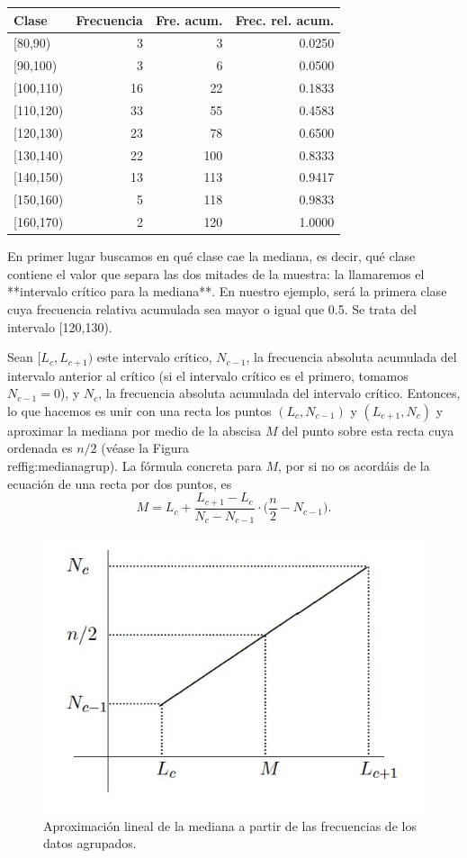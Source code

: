 \documentclass[
]{book}
\theoremstyle{definition}
\theoremstyle{definition}
\theoremstyle{definition}
\theoremstyle{definition}
\theoremstyle{remark}
\begin{document}
\begin{table}
\centering
\begin{tabular}{l|r|r|r}
\hline
Clase & Frecuencia & Fre. acum. & Frec. rel. acum.\\
\hline
[80,90) & 3 & 3 & 0.0250\\
\hline
[90,100) & 3 & 6 & 0.0500\\
\hline
[100,110) & 16 & 22 & 0.1833\\
\hline
[110,120) & 33 & 55 & 0.4583\\
\hline
[120,130) & 23 & 78 & 0.6500\\
\hline
[130,140) & 22 & 100 & 0.8333\\
\hline
[140,150) & 13 & 113 & 0.9417\\
\hline
[150,160) & 5 & 118 & 0.9833\\
\hline
[160,170) & 2 & 120 & 1.0000\\
\hline
\end{tabular}
\end{table}


En primer lugar buscamos en qué clase cae la mediana, es decir, qué clase contiene el valor que separa las dos mitades de la muestra: la llamaremos el  **intervalo crítico para la mediana**. En nuestro ejemplo, será la primera clase cuya frecuencia relativa acumulada sea mayor o igual que 0.5. Se trata del intervalo [120,130).

Sean  $[L_c, L_{c+1})$ este intervalo crítico, $N_{c-1}$, la frecuencia absoluta acumulada del intervalo anterior al crítico (si el intervalo crítico es el primero, tomamos $N_{c-1}=0$), y $N_c$, la frecuencia absoluta acumulada del intervalo crítico. Entonces, lo que hacemos es unir con una recta los puntos $(L_c,N_{c-1})$ y $(L_{c+1},N_c)$ y aproximar  la mediana por medio de la abscisa $M$ del punto sobre esta recta cuya ordenada es $n/2$ (véase la Figura \\ref{fig:medianagrup}). La fórmula concreta  para $M$, por si no os acordáis de la ecuación de una recta por dos puntos, es
$$
M=L_{c}+\frac{L_{c+1}-L_{c}}{N_c-N_{c-1}}\cdot \Big(\frac{n}{2}- N_{c-1}\Big).
$$



\begin{figure}

{\centering \includegraphics[width=0.6\linewidth]{INREMDN_files/figure-html/medianagrup} 

}

\caption{Aproximación lineal de la mediana a partir de las frecuencias de los datos agrupados.}\label{fig:medianagrup}
\end{figure}
\end{document}
